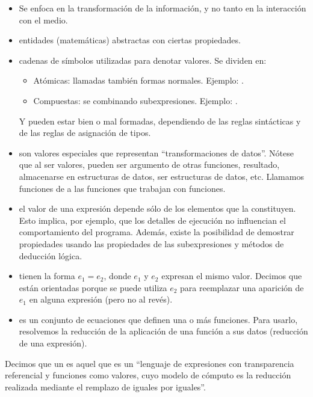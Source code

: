 \begin{itemize}
  \item Se enfoca en la transformación de la información, y no tanto en la interacción con el medio.
  \item {} entidades (matemáticas) abstractas con ciertas propiedades.
  \item {} cadenas de símbolos utilizadas para denotar valores. Se dividen en:
    \begin{itemize}
      \item Atómicas: llamadas también formas normales. Ejemplo: .
      \item Compuestas: se  combinando subexpresiones. Ejemplo: .
    \end{itemize}
    Y pueden estar bien o mal formadas, dependiendo de las reglas sintácticas y de las reglas de asignación de tipos.
  \item {} son valores especiales que representan ``transformaciones de datos''. Nótese que al ser valores, pueden ser argumento de otras funciones, resultado, almacenarse en estructuras de datos, ser estructuras de datos, etc. Llamamos funciones de  a las funciones que trabajan con funciones.
  \item {} el valor de una expresión depende sólo de los elementos que la constituyen. Esto implica, por ejemplo, que los detalles de ejecución no influencian el comportamiento del programa. Además, existe la posibilidad de demostrar propiedades usando las propiedades de las subexpresiones y métodos de deducción lógica.
  \item {} tienen la forma $e_1 = e_2$, donde $e_1$ y $e_2$ expresan el mismo valor. Decimos que están orientadas porque se puede utiliza $e_2$ para reemplazar una aparición de $e_1$ en alguna expresión (pero no al revés).
  \item {} es un conjunto de ecuaciones que definen una o más funciones. Para usarlo, resolvemos la reducción de la aplicación de una función a sus datos (reducción de una expresión).
\end{itemize}

Decimos que un  es aquel que es un ``lenguaje de expresiones con transparencia referencial y funciones como valores, cuyo modelo de cómputo es la reducción realizada mediante el remplazo de iguales por iguales''.

